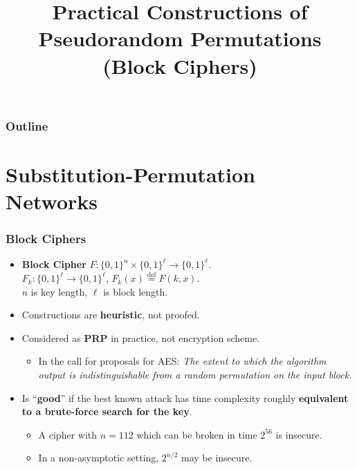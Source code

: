

\title{Practical Constructions of Pseudorandom Permutations (Block Ciphers)}


\maketitle
\begin{frame}
\frametitle{Outline}
\tableofcontents
\end{frame}
\section{Substitution-Permutation Networks}
\begin{frame}\frametitle{Block Ciphers}
\begin{itemize}
\item \textbf{Block Cipher} $F : \{0,1\}^n \times \{0,1\}^\ell \to \{0,1\}^\ell$. \\
$F_k : \{0,1\}^\ell \to \{0,1\}^\ell$, $F_k(x) \overset{\text{def}}{=} F(k,x)$. \\
$n$ is key length, $\ell$ is block length.
\item Constructions are \textbf{heuristic}, not proofed.
\item Considered as \textbf{PRP} in practice, not encryption scheme.
\begin{itemize}
\item In the call for proposals for AES: 
\emph{The extent to which the algorithm output is indistinguishable from a random permutation on the input block.}
\end{itemize}
\item Is ``\textbf{good}'' if the best known attack has time complexity roughly \textbf{equivalent to a brute-force search for the key}.
\begin{itemize}
\item A cipher with $n=112$ which can be broken in time $2^{56}$ is insecure.
\item In a non-asymptotic setting, $2^{n/2}$ may be insecure.
\end{itemize}
\end{itemize}
\end{frame}
